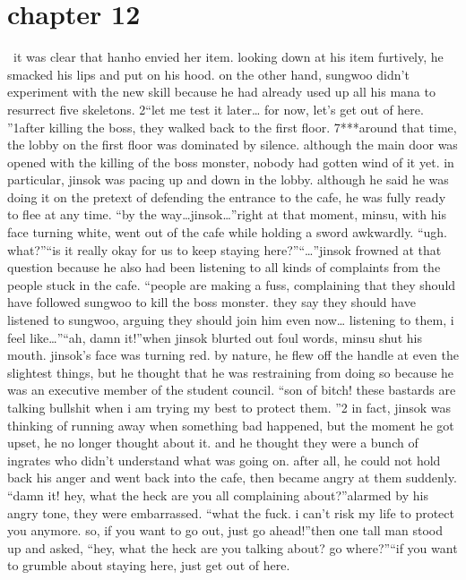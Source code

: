 \section{chapter 12}






 it was clear that hanho envied her item.
 looking down at his item furtively, he smacked his lips and put on his hood.
on the other hand, sungwoo didn’t experiment with the new skill  because he had already used up all his mana to resurrect five skeletons.
2“let me test it later… for now, let’s get out of here.
”1after killing the boss, they walked back to the first floor.
7***around that time, the lobby on the first floor was dominated by silence.
 although the main door was opened with the killing of the boss monster, nobody had gotten wind of it yet.
in particular, jinsok was pacing up and down in the lobby.
 although he said he was doing it on the pretext of defending the entrance to the cafe, he was fully ready to flee at any time.
“by the way…jinsok…”right at that moment, minsu, with his face turning white, went out of the cafe while holding a sword awkwardly.
“ugh.
 what?”“is it really okay for us to keep staying here?”“…”jinsok frowned at that question because he also had been listening to all kinds of complaints from the people stuck in the cafe.
“people are making a fuss, complaining that they should have followed sungwoo to kill the boss monster.
 they say they should have listened to sungwoo, arguing they should join him even now… listening to them, i feel like…”“ah, damn it!”when jinsok blurted out foul words, minsu shut his mouth.
 jinsok’s face was turning red.
 by nature, he flew off the handle at even the slightest things, but he thought that he was restraining from doing so because he was an executive member of the student council.
“son of bitch! these bastards are talking bullshit when i am trying my best to protect them.
”2
in fact, jinsok was thinking of running away when something bad happened, but the moment he got upset, he no longer thought about it.
and he thought they were a bunch of ingrates who didn’t understand what was going on.
 after all, he could not hold back his anger and went back into the cafe, then became angry at them suddenly.
“damn it! hey, what the heck are you all complaining about?”alarmed by his angry tone, they were embarrassed.
“what the fuck.
 i can’t risk my life to protect you anymore.
 so, if you want to go out, just go ahead!”then one tall man stood up and asked, “hey, what the heck are you talking about? go where?”“if you want to grumble about staying here, just get out of here.
